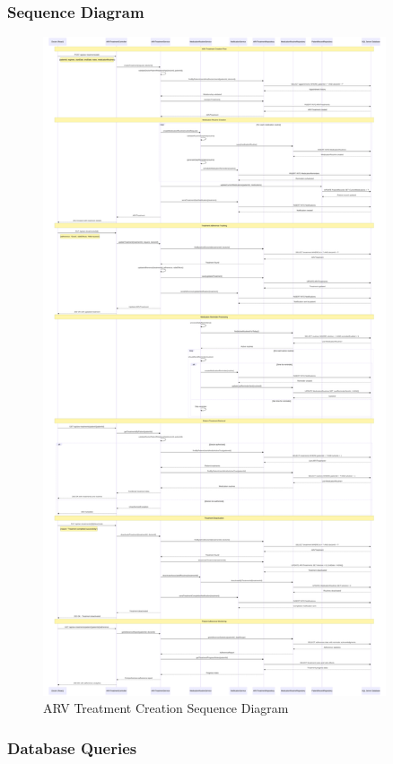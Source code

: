 \documentclass[12pt,a4paper]{article}
\begin{document}
\subsubsection{Sequence Diagram}

\begin{figure}[H]
\centering
\includegraphics[width=0.9\textwidth]{diagrams/arv_treatment_sequence.svg}
\caption{ARV Treatment Creation Sequence Diagram}
\label{fig:arv-sequence}
\end{figure}

\subsubsection{Database Queries}
\end{document}
